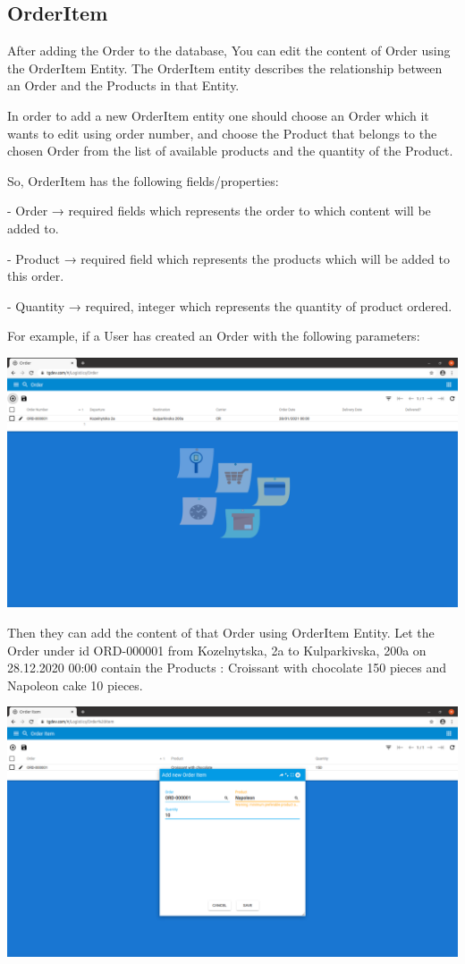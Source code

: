 \subsection{OrderItem}

After adding the Order to the database, You can edit the content of Order using the OrderItem Entity. The OrderItem entity describes the relationship between an Order and the Products in that Entity. 

In order to add a new OrderItem entity one should choose an Order which it wants to edit using order number, and choose the Product that belongs to the chosen Order from the list of available products and the quantity of the Product. 

So, OrderItem has the following fields/properties:


- Order →  required fields which represents the order to which content will be added to.

- Product →  required field which represents the products which will be added to this order.

- Quantity →  required, integer which represents the quantity of product ordered.


For example, if a User has created an Order with the following parameters:

\includegraphics[width=\textwidth]{sections/01-chapter/images/order13.png}

Then they can add the content of that Order using OrderItem Entity. Let the Order under id ORD-000001 from Kozelnytska, 2a to Kulparkivska, 200a on 28.12.2020 00:00 contain the Products : Croissant with chocolate 150  pieces and Napoleon cake 10 pieces. 

\includegraphics[width=\textwidth]{sections/01-chapter/images/orderitem12.png}


